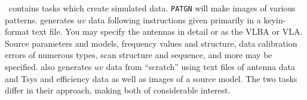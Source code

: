 \AIPS\ contains tasks which create simulated data.  {\tt PATGN} will
make images of various patterns.  {\tt {}} generates $uv$
data following instructions given primarily in a keyin-format text
file.  You may specify the antennas in detail or as the VLBA or VLA\@.
Source parameters and models, frequency values and structure, data
calibration errors of numerous types, scan structure and sequence, and
more may be specified.  {\tt {}} also generates $uv$ data
from ``scratch'' using text files of antenna data and Tsys and
efficiency data as well as images of a source model.  The two tasks
differ in their approach, making both of considerable interest.

